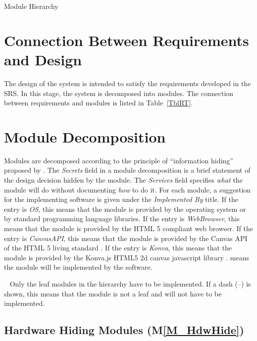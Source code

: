 \documentclass[12pt, titlepage]{article}
\newcommand{\mref}[1]{M\ref{#1}}
\begin{document}
\begin{table}[h!]
\centering

\caption{Module Hierarchy}
\label{TblMH}
\end{table}

\section{Connection Between Requirements and Design} \label{SecConnection}

The design of the system is intended to satisfy the requirements developed in
the SRS. In this stage, the system is decomposed into modules. The connection
between requirements and modules is listed in Table~\ref{TblRT}.

\section{Module Decomposition} \label{SecMD}

Modules are decomposed according to the principle of ``information hiding''
proposed by \citet{ParnasEtAl1984}. The \emph{Secrets} field in a module
decomposition is a brief statement of the design decision hidden by the
module. The \emph{Services} field specifies \emph{what} the module will do
without documenting \emph{how} to do it. For each module, a suggestion for the
implementing software is given under the \emph{Implemented By} title. If the
entry is \emph{OS}, this means that the module is provided by the operating
system or by standard programming language libraries.
If the entry is \emph{WebBrowser}, this means that the module is provided by the 
HTML 5 compliant web browser.
If the entry is \emph{CanvasAPI}, this means that the module is provided by the 
Canvas API of the HTML 5 living standard \cite{html_std_canvas}.
If the entry is \emph{Konva}, this means that the module is provided by the 
Konva.js HTML5 2d canvas javascript library \cite{konva_2021}.
\emph{\progname{}} means the module will be implemented by the \progname{} software.

~\newline
Only the leaf modules in the hierarchy have to be implemented. If a dash
(\emph{--}) is shown, this means that the module is not a leaf and will not have
to be implemented.

\subsection{Hardware Hiding Modules (\mref{M_HdwHide})}
\end{document}
